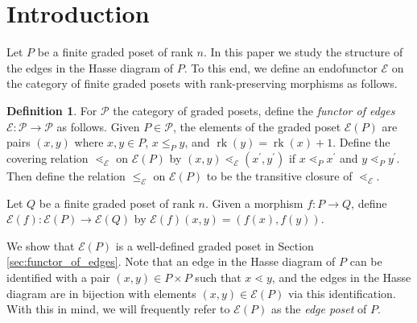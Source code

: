 \documentclass[smallextended, envcountsame, numbook]{svjour3}
\theoremstyle{plain}
\theoremstyle{definition}
\newtheorem{defn}[thm]{Definition}
\theoremstyle{remark}
\numberwithin{equation}{section}
\newcommand\rk{\operatorname{rk}}
\begin{document}
\newpage
\section{Introduction}\label{sec:introduction}


Let $P$ be a finite graded poset of rank $n$.  In this paper we study the structure of the edges in the Hasse diagram of $P$.  To this end, we define an endofunctor $\mathcal{E}$ on the category of finite graded posets with rank-preserving morphisms as follows.

\begin{defn}
\label{defn:functor_of_edges}
For $\mathcal P$ the category of graded posets, define the {\it functor of edges} $\mathcal{E}\colon\mathcal{P} \rightarrow \mathcal{P}$ as follows. Given $P \in \mathcal P$, the elements of the graded poset $\mathcal{E}(P)$ are pairs $(x, y)$ where $x,y\in P$, $x\le_P y$, and $\rk(y) = \rk(x) + 1$. Define the covering relation $\lessdot_{\mathcal{E}}$ on $\mathcal{E}(P)$ by $(x, y) \lessdot_{\mathcal{E}} (x^\prime, y^\prime)$ if $x\lessdot_P x^\prime$ and $y\lessdot_P y^\prime$. Then define the relation $\le_{\mathcal{E}}$ on $\mathcal{E}(P)$ to be the transitive closure of $\lessdot_{\mathcal{E}}$.

Let $Q$ be a finite graded poset of rank $n$. Given a morphism $f\colon P\rightarrow Q$, define $\mathcal{E}(f)\colon \mathcal{E}(P)\rightarrow \mathcal{E}(Q)$ by $\mathcal{E}(f)(x,y) = (f(x), f(y))$.
\end{defn}

We show that $\mathcal{E}(P)$ is a well-defined graded poset in Section \ref{sec:functor_of_edges}.  Note that an edge in the Hasse diagram of $P$ can be identified with a pair $(x,y)\in P\times P$ such that $x\lessdot y$, and the edges in the Hasse diagram are in bijection with elements $(x,y)\in \mathcal E(P)$ via this identification.  With this in mind, we will frequently refer to $\mathcal{E}(P)$ as the {\it edge poset} of $P$. 
\end{document}
